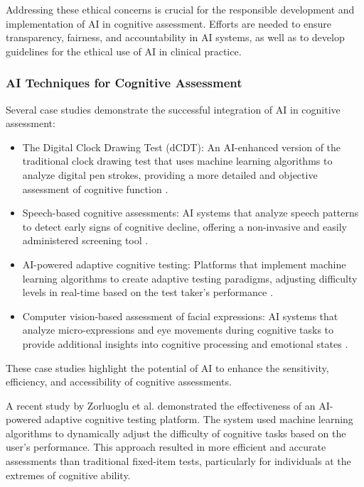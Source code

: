 Addressing these ethical concerns is crucial for the responsible development and implementation of AI in cognitive assessment. Efforts are needed to ensure transparency, fairness, and accountability in AI systems, as well as to develop guidelines for the ethical use of AI in clinical practice.

\subsubsection{AI Techniques for Cognitive Assessment}
Several case studies demonstrate the successful integration of AI in cognitive assessment:
\begin{itemize}
    \item The Digital Clock Drawing Test (dCDT): An AI-enhanced version of the traditional clock drawing test that uses machine learning algorithms to analyze digital pen strokes, providing a more detailed and objective assessment of cognitive function \cite{Davis2017}.
    \item Speech-based cognitive assessments: AI systems that analyze speech patterns to detect early signs of cognitive decline, offering a non-invasive and easily administered screening tool \cite{Fraser2019}.
    \item AI-powered adaptive cognitive testing: Platforms that implement machine learning algorithms to create adaptive testing paradigms, adjusting difficulty levels in real-time based on the test taker's performance \cite{Zorluoglu2020}.
    \item Computer vision-based assessment of facial expressions: AI systems that analyze micro-expressions and eye movements during cognitive tasks to provide additional insights into cognitive processing and emotional states \cite{Bandara2018}.
\end{itemize}
These case studies highlight the potential of AI to enhance the sensitivity, efficiency, and accessibility of cognitive assessments.

A recent study by Zorluoglu et al. \cite{Zorluoglu2020} demonstrated the effectiveness of an AI-powered adaptive cognitive testing platform. The system used machine learning algorithms to dynamically adjust the difficulty of cognitive tasks based on the user's performance. This approach resulted in more efficient and accurate assessments than traditional fixed-item tests, particularly for individuals at the extremes of cognitive ability.

